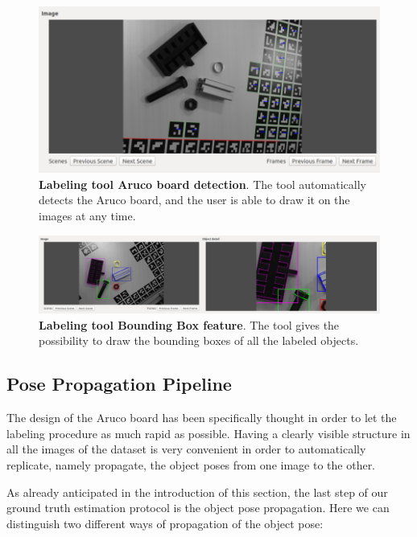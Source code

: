 \begin{figure}
    \centering
    \includegraphics[width=\textwidth]{figures/3_raw_dataset/labeltool_detail_1}
    \caption{\textbf{Labeling tool Aruco board detection}. The tool automatically detects the Aruco board, and the user is able to draw it on the images at any time.}
    \label{fig:labeltool_detail_1}
\end{figure}

\begin{figure}
    \centering
    \includegraphics[width=\textwidth]{figures/3_raw_dataset/labeltool_detail_2}
    \caption{\textbf{Labeling tool Bounding Box feature}. The tool gives the possibility to draw the bounding boxes of all the labeled objects.}
    \label{fig:labeltool_detail_2}
\end{figure}

\subsection{Pose Propagation Pipeline}\label{subsec:pose_propagation}
The design of the Aruco board has been specifically thought in order to let the labeling procedure as much rapid as possible. Having a clearly visible structure in all the images of the dataset is very convenient in order to automatically replicate, namely propagate, the object poses from one image to the other.

As already anticipated in the introduction of this section, the last step of our ground truth estimation protocol is the object pose propagation. Here we can distinguish two different ways of propagation of the object pose:

